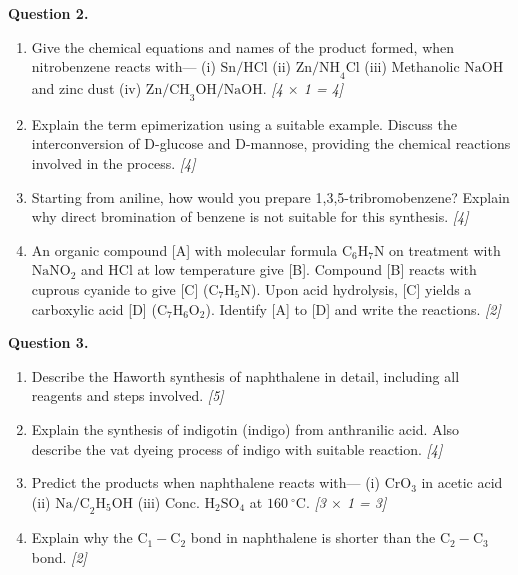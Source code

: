 \documentclass[11pt,a4paper]{article}
\newcommand{\pts}[1]{\hfill \textit{[#1]}}
\begin{document}
\noindent \textbf{Question 2.}
\begin{enumerate}[label=(\alph*)]
  \item Give the chemical equations and names of the product formed, when nitrobenzene reacts with--- (i) $\text{Sn/HCl}$ (ii) $\text{Zn/NH}_4\text{Cl}$ (iii) Methanolic $\text{NaOH}$ and zinc dust (iv) $\text{Zn/CH}_3\text{OH/NaOH}$. \pts{4 $\times$ 1 = 4}
  \item Explain the term epimerization using a suitable example. Discuss the interconversion of D-glucose and D-mannose, providing the chemical reactions involved in the process. \pts{4}
  \item Starting from aniline, how would you prepare 1,3,5-tribromobenzene? Explain why direct bromination of benzene is not suitable for this synthesis. \pts{4}
  \item An organic compound [A] with molecular formula $\text{C}_6\text{H}_7\text{N}$ on treatment with $\text{NaNO}_2$ and $\text{HCl}$ at low temperature give [B]. Compound [B] reacts with cuprous cyanide to give [C] ($\text{C}_7\text{H}_5\text{N}$). Upon acid hydrolysis, [C] yields a carboxylic acid [D] ($\text{C}_7\text{H}_6\text{O}_2$). Identify [A] to [D] and write the reactions. \pts{2}
\end{enumerate}

\bigskip

\noindent \textbf{Question 3.}
\begin{enumerate}[label=(\alph*)]
  \item Describe the Haworth synthesis of naphthalene in detail, including all reagents and steps involved. \pts{5}
  \item Explain the synthesis of indigotin (indigo) from anthranilic acid. Also describe the vat dyeing process of indigo with suitable reaction. \pts{4}
  \item Predict the products when naphthalene reacts with--- (i) $\text{CrO}_3$ in acetic acid (ii) $\text{Na/C}_2\text{H}_5\text{OH}$ (iii) Conc. $\text{H}_2\text{SO}_4$ at $160\ ^\circ\text{C}$. \pts{3 $\times$ 1 = 3}
  \item Explain why the $\text{C}_1-\text{C}_2$ bond in naphthalene is shorter than the $\text{C}_2-\text{C}_3$ bond. \pts{2}
\end{enumerate}

\bigskip
\end{document}
